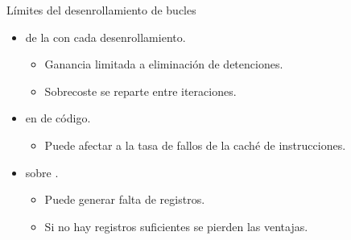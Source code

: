 \begin{frame}[t]{Límites del desenrollamiento de bucles}
\begin{itemize}
  \item {} de la  con cada desenrollamiento.
    \begin{itemize}
      \item Ganancia limitada a eliminación de detenciones.
      \item Sobrecoste se reparte entre iteraciones.
    \end{itemize}

  \item {} en  de código.
    \begin{itemize}
      \item Puede afectar a la tasa de fallos de la caché de instrucciones.
    \end{itemize}

  \item {} sobre .
    \begin{itemize}
      \item Puede generar falta de registros.
      \item Si no hay registros suficientes se pierden las ventajas.
    \end{itemize}

\end{itemize}
\end{frame}

